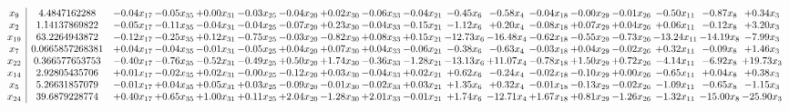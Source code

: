\documentclass[9pt]{article}
\begin{document}
 \[\begin{array}{c| c c@{\hskip 2pt} c@{\hskip 2pt} c@{\hskip 2pt} c@{\hskip 2pt} c@{\hskip 2pt} c@{\hskip 2pt} c@{\hskip 2pt} c@{\hskip 2pt} c@{\hskip 2pt} c@{\hskip 2pt} c@{\hskip 2pt} c@{\hskip 2pt} c@{\hskip 2pt} c@{\hskip 2pt} c@{\hskip 2pt} c@{\hskip 2pt} }
 x_{9}   &  4.4847162288 & -0.04 x_{17} & -0.05 x_{35} & +  0.00 x_{31} & -0.03 x_{25} & -0.04 x_{20} & +  0.02 x_{30} & -0.06 x_{33} & -0.04 x_{21} & -0.45 x_{6} & -0.58 x_{4} & -0.04 x_{18} & -0.00 x_{29} & -0.01 x_{26} & -0.50 x_{11} & -0.87 x_{8} & +  0.34 x_{3}\\
 x_{2}   &  1.14137869822 & -0.05 x_{17} & -0.11 x_{35} & -0.04 x_{31} & -0.04 x_{25} & -0.07 x_{20} & +  0.23 x_{30} & -0.04 x_{33} & -0.15 x_{21} & -1.12 x_{6} & +  0.20 x_{4} & -0.08 x_{18} & +  0.07 x_{29} & +  0.04 x_{26} & +  0.06 x_{11} & -0.12 x_{8} & +  3.20 x_{3}\\
 x_{19}   &  63.2264943872 & -0.12 x_{17} & -0.25 x_{35} & +  0.12 x_{31} & -0.75 x_{25} & -0.03 x_{20} & -0.82 x_{30} & +  0.08 x_{33} & +  0.15 x_{21} & -12.73 x_{6} & -16.48 x_{4} & -0.62 x_{18} & -0.55 x_{29} & -0.73 x_{26} & -13.24 x_{11} & -14.19 x_{8} & -7.99 x_{3}\\
 x_{7}   &  0.0665857268381 & +  0.04 x_{17} & -0.04 x_{35} & -0.01 x_{31} & -0.05 x_{25} & +  0.04 x_{20} & +  0.07 x_{30} & +  0.04 x_{33} & -0.06 x_{21} & -0.38 x_{6} & -0.63 x_{4} & -0.03 x_{18} & +  0.04 x_{29} & -0.02 x_{26} & +  0.32 x_{11} & -0.09 x_{8} & +  1.46 x_{3}\\
 x_{22}   &  0.366577653753 & -0.40 x_{17} & -0.76 x_{35} & -0.52 x_{31} & -0.49 x_{25} & +  0.50 x_{20} & +  1.74 x_{30} & -0.36 x_{33} & -1.28 x_{21} & -13.13 x_{6} & + 11.07 x_{4} & -0.78 x_{18} & +  1.50 x_{29} & +  0.72 x_{26} & -4.14 x_{11} & -6.92 x_{8} & + 19.73 x_{3}\\
 x_{14}   &  2.92805435706 & +  0.01 x_{17} & -0.02 x_{35} & +  0.02 x_{31} & -0.00 x_{25} & -0.12 x_{20} & +  0.03 x_{30} & -0.04 x_{33} & +  0.02 x_{21} & +  0.62 x_{6} & -0.24 x_{4} & -0.02 x_{18} & -0.10 x_{29} & +  0.00 x_{26} & -0.65 x_{11} & +  0.04 x_{8} & +  0.38 x_{3}\\
 x_{5}   &  5.26631857079 & -0.01 x_{17} & +  0.04 x_{35} & +  0.05 x_{31} & +  0.03 x_{25} & -0.09 x_{20} & -0.01 x_{30} & -0.02 x_{33} & +  0.03 x_{21} & +  1.35 x_{6} & +  0.32 x_{4} & -0.01 x_{18} & -0.13 x_{29} & -0.02 x_{26} & -1.09 x_{11} & -0.65 x_{8} & -1.15 x_{3}\\
 x_{24}   &  39.6879228774 & +  0.40 x_{17} & +  0.65 x_{35} & +  1.00 x_{31} & +  0.11 x_{25} & +  2.04 x_{20} & -1.28 x_{30} & +  2.01 x_{33} & -0.01 x_{21} & +  1.74 x_{6} & -12.71 x_{4} & +  1.67 x_{18} & +  0.81 x_{29} & -1.26 x_{26} & -1.32 x_{11} & -15.00 x_{8} & -25.90 x_{3}\\

\end{array}\]
\end{document}
